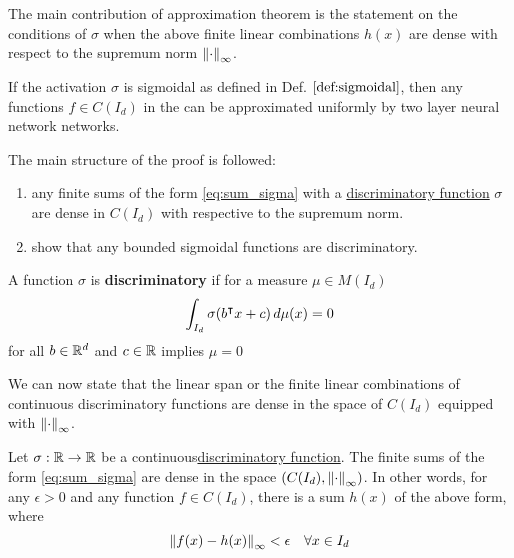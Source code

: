 The main contribution of approximation theorem is the statement on the
conditions of $\sigma$ when the above finite linear combinations $h(x)$ are
dense with respect to the supremum norm $\left\| \cdot \right\|_{\infty}$.

\begin{theorem}
    \label{thm:uat}
    If the activation $\sigma$ is sigmoidal as defined in Def.
    $\ref{def:sigmoidal}$, then any functions $f \in C(I_d)$ in the can be
    approximated uniformly by two layer neural network networks.
\end{theorem}


The main structure of the proof is followed:
\begin{enumerate}
    \item any finite sums of the form \eqref{eq:sum_sigma} with a
    \hyperref[def:dis_func]{discriminatory function} $\sigma$ are dense in
    $C(I_d)$ with respective to the supremum norm.
    \item show that any bounded sigmoidal functions are discriminatory.
\end{enumerate}

\begin{definition}
    \label{def:dis_func}
    A function $\sigma$ is \textbf{discriminatory} if for a measure $\mu \in
    M(I_d)$
    \begin{equation}
        \int_{I_d} \sigma(b{}^{\intercal} x + c) \,d\mu(x) = 0
    \end{equation}
    for all $b \in \mathbb{R}^d$ and $c \in \mathbb{R}$ implies $\mu = 0$
\end{definition}

We can now state that the linear span or the finite linear combinations of
continuous discriminatory functions are dense in the space of $C(I_d)$ equipped
with $\left\| \cdot \right\|_{\infty}$.

\begin{theorem}
    Let $\sigma: \mathbb{R} \to \mathbb{R}$ be a
    continuous\hyperref[def:dis_func]{discriminatory function}. The finite sums
    of the form \eqref{eq:sum_sigma} are dense in the space $(C(I_d),
    \left\| \cdot \right\|_{\infty})$. In other words, for any $\epsilon > 0$ and any
    function $f \in C(I_d)$, there is a sum $h(x)$ of the above form, where
    \begin{equation}
        \left\| f(x) - h(x) \right\|_{\infty} < \epsilon \quad \forall x \in I_d
    \end{equation}
\end{theorem}

